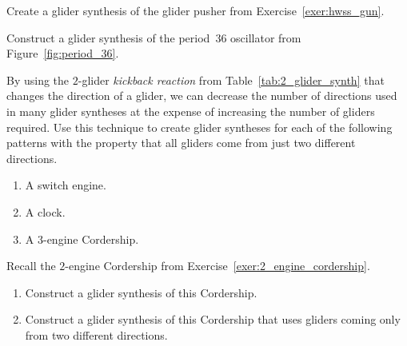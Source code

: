 \begin{multicols}{2}
\mfilbreak


\begin{problem}\label{exer:synthesize_glider_pusher}
	Create a glider synthesis of the glider pusher from Exercise~\ref{exer:hwss_gun}.
\end{problem}


\mfilbreak


\begin{problem}\label{exer:oscillator_syntheses}
	Construct a glider synthesis of the period~36 oscillator from Figure~\ref{fig:period_36}.
\end{problem}


\mfilbreak


\begin{problemstar}\label{exer:glider_synth_two_directions}
	By using the $2$-glider \emph{kickback reaction} from Table~\ref{tab:2_glider_synth} that changes the direction of a glider, we can decrease the number of directions used in many glider syntheses at the expense of increasing the number of gliders required. Use this technique to create glider syntheses for each of the following patterns with the property that all gliders come from just two different directions.
	\begin{enumerate}[label=\bf\color{ocre}(\alph*)]
		\item A switch engine.
		
		\item A clock.
		
		\item A $3$-engine Cordership.
	\end{enumerate}
\end{problemstar}


\mfilbreak


\begin{problemstar}\label{exer:2_engine_cordership_synthesis}
	Recall the $2$-engine Cordership from Exercise~\ref{exer:2_engine_cordership}.\smallskip
	
	\begin{enumerate}[label=\bf\color{ocre}(\alph*)]
		\item Construct a glider synthesis of this Cordership.
		
		\item Construct a glider synthesis of this Cordership that uses gliders coming only from two different directions.
		

\end{enumerate}
\end{problemstar}
\end{multicols}

